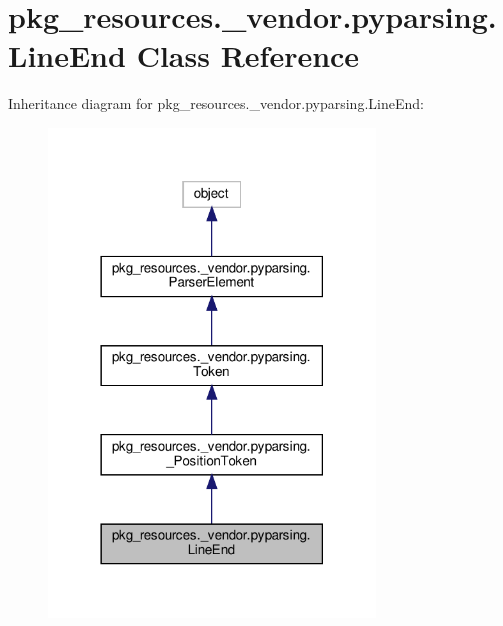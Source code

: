 \hypertarget{classpkg__resources_1_1__vendor_1_1pyparsing_1_1LineEnd}{}\section{pkg\+\_\+resources.\+\_\+vendor.\+pyparsing.\+Line\+End Class Reference}
\label{classpkg__resources_1_1__vendor_1_1pyparsing_1_1LineEnd}


Inheritance diagram for pkg\+\_\+resources.\+\_\+vendor.\+pyparsing.\+Line\+End\+:
\nopagebreak
\begin{figure}[H]
\begin{center}
\leavevmode
\includegraphics[width=246pt]{classpkg__resources_1_1__vendor_1_1pyparsing_1_1LineEnd__inherit__graph}
\end{center}
\end{figure}


